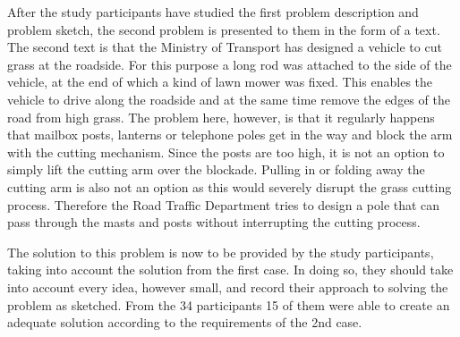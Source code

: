 \documentclass[12pt]{article}
\begin{document}
After the study participants have studied the first problem description and problem sketch, the second problem is presented to them in the form of a text. 
The second text is that the Ministry of Transport has designed a vehicle to cut grass at the roadside. For this purpose a long rod was attached to the side of the vehicle, at the end of which a kind of lawn mower was fixed. This enables the vehicle to drive along the roadside and at the same time remove the edges of the road from high grass. The problem here, however, is that it regularly happens that mailbox posts, lanterns or telephone poles get in the way and block the arm with the cutting mechanism. Since the posts are too high, it is not an option to simply lift the cutting arm over the blockade. Pulling in or folding away the cutting arm is also not an option as this would severely disrupt the grass cutting process. Therefore the Road Traffic Department tries to design a pole that can pass through the masts and posts without interrupting the cutting process. 

The solution to this problem is now to be provided by the study participants, taking into account the solution from the first case. In doing so, they should take into account every idea, however small, and record their approach to solving the problem as sketched.  From the 34 participants 15 of them were able to create an adequate solution according to the requirements of the 2nd case. 
\end{document}
